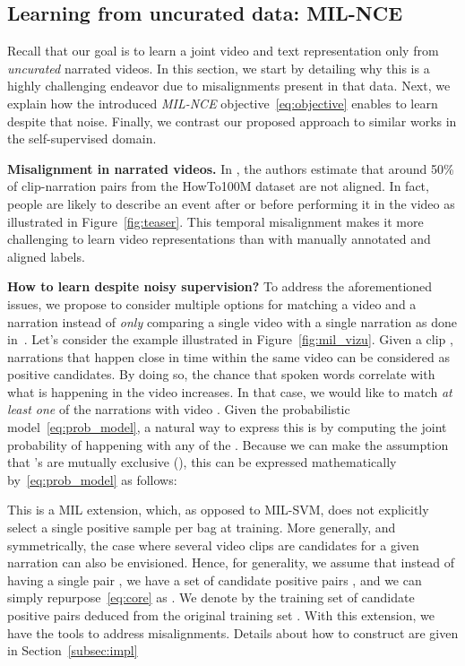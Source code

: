 \documentclass[10pt,twocolumn,letterpaper]{article}
\begin{document}
\subsection{Learning from uncurated data: MIL-NCE}
\label{sec:losses}

Recall that our goal is to learn a joint video and text representation only from \emph{uncurated} narrated videos.
In this section, we start by detailing why this is a highly challenging endeavor due to misalignments present in that data.
Next, we explain how the introduced \emph{MIL-NCE} objective~\eqref{eq:objective} enables to learn despite that noise.
Finally, we contrast our proposed approach to similar works in the self-supervised domain.

\noindent
\textbf{Misalignment in narrated videos.}
In \cite{miech19howto100m}, the authors estimate that around 50\% of clip-narration pairs from the HowTo100M dataset are not aligned.
In fact, people are likely to describe an event after or before performing it in the video as illustrated in Figure~\ref{fig:teaser}.
This temporal misalignment makes it more challenging to learn video representations than with manually annotated and aligned labels.

\noindent
\textbf{How to learn despite noisy supervision?}
To address the aforementioned issues, we propose to consider multiple options for matching a video and a narration instead of \emph{only} comparing a single video  with a single narration  as done in~\cite{miech19howto100m}.
Let's consider the example illustrated in Figure~\ref{fig:mil_vizu}.
Given a clip ,  narrations  that happen close in time within the same video can be considered as positive candidates.
By doing so, the chance that spoken words correlate with what is happening in the video increases.
In that case, we would like to match \emph{at least one} of the narrations  with video .
Given the probabilistic model~\eqref{eq:prob_model}, a natural way to express this is by computing the joint probability of  happening with any of the .
Because we can make the assumption that 's are mutually exclusive (\ie ), this can be expressed mathematically by~\eqref{eq:prob_model} as follows:

This is a MIL extension, which, as opposed to MIL-SVM, does not explicitly select a single positive sample per bag at training.
More generally, and symmetrically, the case where several video clips are candidates for a given narration can also be envisioned.
Hence, for generality, we assume that instead of having a single pair , we have a set of candidate positive pairs , and we can simply repurpose~\eqref{eq:core} as .
We denote by  the training set of candidate positive pairs deduced from the original training set .
With this extension, we have the tools to address misalignments.
Details about how to construct  are given in Section~\ref{subsec:impl}
\end{document}
